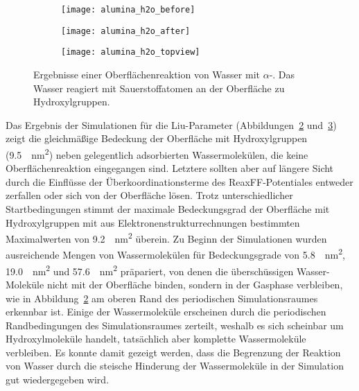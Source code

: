 \begin{figure}
  \captionsetup[subfigure]{singlelinecheck=false}
  \def\subfigwidth{0.32\textwidth}
  \begin{subfigure}[t]{\subfigwidth}
    \texttt{[image: alumina\_h2o\_before]}
    \label{fig:wateraluminasurface-a}
  \end{subfigure}
  \hfill
  \begin{subfigure}[t]{\subfigwidth}
    \texttt{[image: alumina\_h2o\_after]}
    \label{fig:wateraluminasurface-b}
  \end{subfigure}
  \hfill
  \begin{subfigure}[t]{\subfigwidth}
    \texttt{[image: alumina\_h2o\_topview]}
    \label{fig:wateraluminasurface-c}
  \end{subfigure}
  \caption[Oberflächenreaktion von Wasser mit $\alpha$-]{Ergebnisse einer Oberflächenreaktion von Wasser mit $\alpha$-.
    Das Wasser reagiert mit Sauerstoffatomen an der Oberfläche zu Hydroxylgruppen.
  }
  \label{fig:wateraluminasurface}
\end{figure}

Das Ergebnis der Simulationen für die Liu-Parameter (Abbildungen~\ref{fig:wateraluminasurface-b} und~\ref{fig:wateraluminasurface-c}) zeigt die gleichmäßige Bedeckung der Oberfläche mit Hydroxylgruppen (\SI{9.5}{\per\square\nano\meter}) neben gelegentlich adsorbierten Wassermolekülen, die keine Oberflächenreaktion eingegangen sind.
Letztere sollten aber auf längere Sicht durch die Einflüsse der Überkoordinationsterme des ReaxFF-Potentiales entweder zerfallen oder sich von der Oberfläche lösen.
Trotz unterschiedlicher Startbedingungen stimmt der maximale Bedeckungsgrad der Oberfläche mit Hydroxylgruppen mit aus Elektronenstrukturrechnungen bestimmten Maximalwerten von \SI{9.2}{\per\square\nano\meter}\cite{kim_energy_2011} überein.
Zu Beginn der Simulationen wurden ausreichende Mengen von Wassermolekülen für Bedeckungsgrade von \SI{5.8}{\per\square\nano\meter}, \SI{19.0}{\per\square\nano\meter} und \SI{57.6}{\per\square\nano\meter} präpariert, von denen die überschüssigen Wasser-Moleküle nicht mit der Oberfläche binden, sondern in der Gasphase verbleiben, wie in Abbildung~\ref{fig:wateraluminasurface-b} am oberen Rand des periodischen Simulationsraumes erkennbar ist.
Einige der Wassermoleküle erscheinen durch die periodischen Randbedingungen des Simulationsraumes zerteilt, weshalb es sich scheinbar um Hydroxylmoleküle handelt, tatsächlich aber komplette Wassermoleküle verbleiben.
Es konnte damit gezeigt werden, dass die Begrenzung der Reaktion von Wasser durch die steische Hinderung der Wassermoleküle in der Simulation gut wiedergegeben wird.

